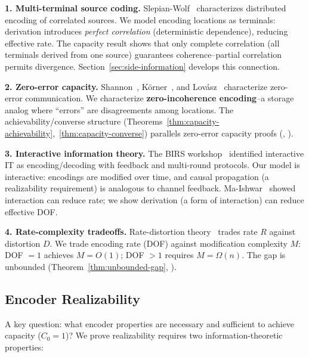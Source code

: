 \textbf{1. Multi-terminal source coding.} Slepian-Wolf~\cite{slepian1973noiseless} characterizes distributed encoding of correlated sources. We model encoding locations as terminals: derivation introduces \emph{perfect correlation} (deterministic dependence), reducing effective rate. The capacity result shows that only complete correlation (all terminals derived from one source) guarantees coherence--partial correlation permits divergence. Section~\ref{sec:side-information} develops this connection.

\textbf{2. Zero-error capacity.} Shannon~\cite{shannon1956zero}, Körner~\cite{korner1973graphs}, and Lovász~\cite{lovasz1979shannon} characterize zero-error communication. We characterize \textbf{zero-incoherence encoding}--a storage analog where ``errors'' are disagreements among locations. The achievability/converse structure (Theorems~\ref{thm:capacity-achievability},~\ref{thm:capacity-converse}) parallels zero-error capacity proofs (, ).

\textbf{3. Interactive information theory.} The BIRS workshop~\cite{birs2012interactive} identified interactive IT as encoding/decoding with feedback and multi-round protocols. Our model is interactive: encodings are modified over time, and causal propagation (a realizability requirement) is analogous to channel feedback. Ma-Ishwar~\cite{ma2011distributed} showed interaction can reduce rate; we show derivation (a form of interaction) can reduce effective DOF.

\textbf{4. Rate-complexity tradeoffs.} Rate-distortion theory~\cite{cover2006elements} trades rate $R$ against distortion $D$. We trade encoding rate (DOF) against modification complexity $M$: DOF $= 1$ achieves $M = O(1)$; DOF $> 1$ requires $M = \Omega(n)$. The gap is unbounded (Theorem~\ref{thm:unbounded-gap}, ).

\subsection{Encoder Realizability}\label{sec:realizability}

A key question: what encoder properties are necessary and sufficient to achieve capacity ($C_0 = 1$)? We prove realizability requires two information-theoretic properties:

